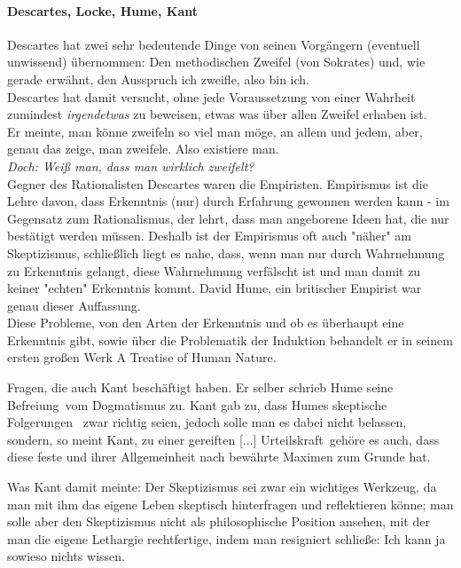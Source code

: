 \documentclass[12pt,a4paper]{article}
\begin{document}
		\paragraph{Descartes, Locke, Hume, Kant}
Descartes hat zwei sehr bedeutende Dinge von seinen Vorgängern (eventuell unwissend) übernommen: Den methodischen Zweifel (von Sokrates) und, wie gerade erwähnt, den Ausspruch \glqq ich zweifle, also bin ich\grqq.\\%
Descartes hat damit versucht, ohne jede Voraussetzung von einer Wahrheit zumindest \emph{irgendetwas} zu \glqq beweisen\grqq, etwas was über allen Zweifel erhaben ist.\\
Er meinte, man könne zweifeln so viel man möge, an allem und jedem, aber, genau das zeige, man zweifele. Also existiere man.\\ %
\emph{Doch: Weiß man, dass man wirklich zweifelt?}\\ %

Gegner des Rationalisten Descartes waren die Empiristen. Empirismus ist die Lehre davon, dass Erkenntnis (nur) durch Erfahrung gewonnen werden kann - im Gegensatz zum Rationalismus, der lehrt, dass man angeborene Ideen hat, die nur bestätigt werden müssen. Deshalb ist der Empirismus oft auch "näher" am Skeptizismus, schließlich liegt es nahe, dass, wenn man nur durch Wahrnehmung zu Erkenntnis gelangt, diese Wahrnehmung verfälscht ist und man damit zu keiner "echten" Erkenntnis kommt. David Hume, ein britischer Empirist war genau dieser Auffassung.\\
Diese Probleme, von den Arten der Erkenntnis und ob es überhaupt eine Erkenntnis gibt, sowie über die Problematik der Induktion behandelt er in seinem ersten großen Werk \glqq A Treatise of Human Nature\grqq.

Fragen, die auch Kant beschäftigt haben. Er selber schrieb Hume seine \glqq Befreiung\grqq\ vom Dogmatismus zu. Kant gab zu, dass Humes skeptische Folgerungen%
\ zwar richtig seien, jedoch solle man es dabei nicht belassen, sondern, so meint Kant, zu einer  \glqq gereiften [...] Urteilskraft\grqq\ gehöre es auch, dass diese \glqq feste und ihrer Allgemeinheit nach bewährte Maximen zum Grunde hat\grqq.%

Was Kant damit meinte: Der Skeptizismus sei zwar ein wichtiges Werkzeug, da man mit ihm das eigene Leben skeptisch hinterfragen und reflektieren könne; man solle aber den Skeptizismus nicht als philosophische Position ansehen, mit der man die eigene Lethargie rechtfertige, indem man resigniert schließe: \glqq Ich kann ja sowieso nichts wissen\grqq .
\end{document}
